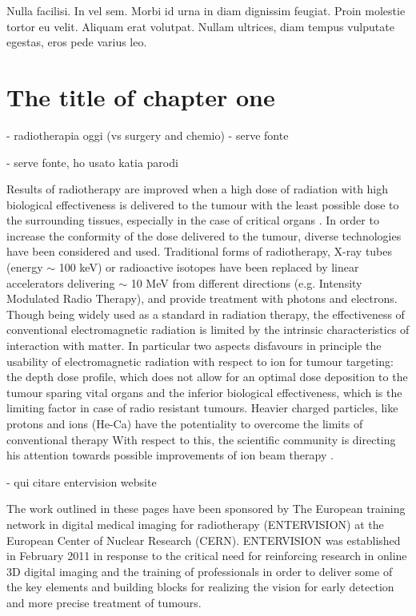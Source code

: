 \begin{savequote}[75mm] 
Nulla facilisi. In vel sem. Morbi id urna in diam dignissim feugiat. Proin molestie tortor eu velit. Aliquam erat volutpat. Nullam ultrices, diam tempus vulputate egestas, eros pede varius leo.
\end{savequote}

\chapter{The title of chapter one}

- radiotherapia oggi (vs surgery and chemio) - serve fonte

- serve fonte, ho usato katia parodi

Results of radiotherapy are improved when a high dose of radiation with high biological effectiveness is delivered to the tumour with the least possible dose to the surrounding tissues, especially in the case of critical organs \cite{Linz2011}.
In order to increase the conformity of the dose delivered to the tumour, diverse technologies have been considered and used.
Traditional forms of radiotherapy, X-ray tubes (energy $\sim$ 100 keV) or radioactive isotopes have been replaced by linear accelerators delivering $\sim$ 10 MeV from different directions (e.g. Intensity Modulated Radio Therapy), and provide treatment with photons and electrons.
Though being widely used as a standard in radiation therapy, the effectiveness of conventional electromagnetic radiation is limited by the intrinsic characteristics of interaction with matter.
In particular two aspects disfavours in principle the usability of electromagnetic radiation with respect to ion for tumour targeting: the depth dose profile, which does not allow for an optimal dose deposition to the tumour sparing vital organs
and the inferior biological effectiveness, which is the limiting factor in case of radio resistant tumours.
Heavier charged particles, like protons and ions (He-Ca) have the potentiality to overcome the limits of conventional therapy With respect to this, the scientific community is directing his attention towards possible improvements of ion beam therapy \cite{Amaldi2011}.

- qui citare entervision website

The work outlined in these pages have been sponsored by  The European training network in digital medical imaging for radiotherapy (ENTERVISION) at the European Center of Nuclear Research (CERN). ENTERVISION was established in February 2011 in response to the critical need for reinforcing research in online 3D digital imaging and the training of professionals in order to deliver some of the key elements and building blocks for realizing the vision for early detection and more precise treatment of tumours.

